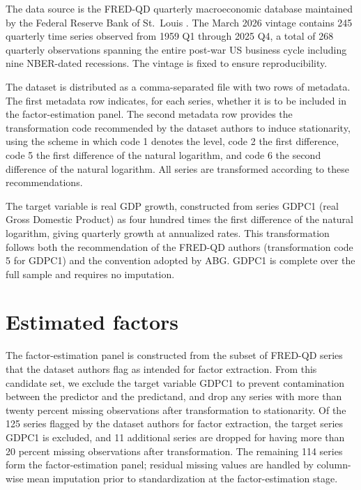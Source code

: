 \documentclass[12pt]{report} %
\begin{document}
The data source is the FRED-QD quarterly macroeconomic database maintained by the Federal Reserve Bank of St.~Louis \parencite{mccracken2020fredqd}. The March 2026 vintage contains 245 quarterly time series observed from 1959 Q1 through 2025 Q4, a total of 268 quarterly observations spanning the entire post-war US business cycle including nine NBER-dated recessions. The vintage is fixed to ensure reproducibility.

The dataset is distributed as a comma-separated file with two rows of metadata. The first metadata row indicates, for each series, whether it is to be included in the factor-estimation panel. The second metadata row provides the transformation code recommended by the dataset authors to induce stationarity, using the scheme in which code 1 denotes the level, code 2 the first difference, code 5 the first difference of the natural logarithm, and code 6 the second difference of the natural logarithm. All series are transformed according to these recommendations.

The target variable is real GDP growth, constructed from series GDPC1 (real Gross Domestic Product) as four hundred times the first difference of the natural logarithm, giving quarterly growth at annualized rates. This transformation follows both the recommendation of the FRED-QD authors (transformation code 5 for GDPC1) and the convention adopted by ABG. GDPC1 is complete over the full sample and requires no imputation.

\section{Estimated factors}
\label{sec:factors-est}

The factor-estimation panel is constructed from the subset of FRED-QD series that the dataset authors flag as intended for factor extraction. From this candidate set, we exclude the target variable GDPC1 to prevent contamination between the predictor and the predictand, and drop any series with more than twenty percent missing observations after transformation to stationarity. Of the 125 series flagged by the dataset authors for factor extraction, the target series GDPC1 is excluded, and 11 additional series are dropped for having more than 20 percent missing observations after transformation. The remaining 114 series form the factor-estimation panel; residual missing values are handled by column-wise mean imputation prior to standardization at the factor-estimation stage.
\end{document}
